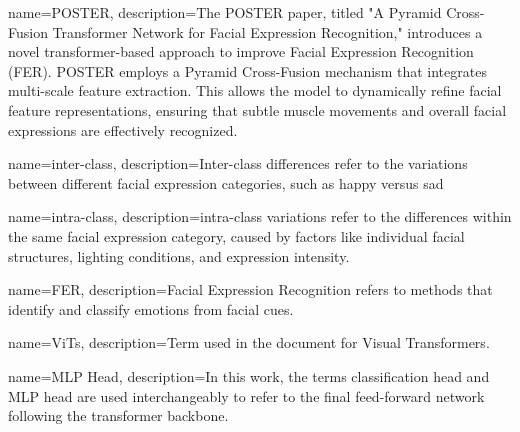 
 

{
    name=POSTER,
    description={The POSTER paper, titled "A Pyramid Cross-Fusion Transformer Network for Facial Expression Recognition," introduces a novel transformer-based approach to improve Facial Expression Recognition (FER). POSTER employs a Pyramid Cross-Fusion mechanism that integrates multi-scale feature extraction. This allows the model to dynamically refine facial feature representations, ensuring that subtle muscle movements and overall facial expressions are effectively recognized.}
}

{
    name=inter-class,
    description={Inter-class differences refer to the variations between different facial expression categories, such as happy versus sad}
}


{
    name=intra-class,
    description={intra-class variations refer to the differences within the same facial expression category, caused by factors like individual facial structures, lighting conditions, and expression intensity.}
}


{
    name=FER,
    description={Facial Expression Recognition refers to methods that identify and classify emotions from facial cues.}
}


{	
    name=ViTs,
    description={Term used in the document for Visual Transformers.}
}


{	
    name=MLP Head,
    description={In this work, the terms classification head and MLP head are used interchangeably to refer to the final feed-forward network following the transformer backbone.}
}

